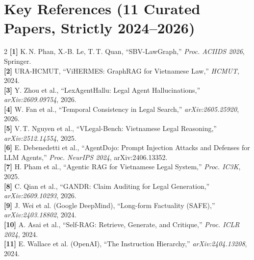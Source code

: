 \documentclass[10pt,a4paper]{article}
\begin{document}
\section{Key References (11 Curated Papers, Strictly 2024--2026)}
\vspace{-1.5pt}
\begin{multicols}{2}
  \fontsize{5.9pt}{7.0pt}\selectfont\color{darkgray}
  \textbf{[1]} K.\,N. Phan, X.-B. Le, T.\,T. Quan, ``SBV-LawGraph,'' \textit{Proc. ACIIDS 2026}, Springer.\\
  \textbf{[2]} URA-HCMUT, ``ViHERMES: GraphRAG for Vietnamese Law,'' \textit{HCMUT}, 2024.\\
  \textbf{[3]} Y. Zhou et al., ``LexAgentHallu: Legal Agent Hallucinations,'' \textit{arXiv:2609.09754}, 2026.\\
  \textbf{[4]} W. Fan et al., ``Temporal Consistency in Legal Search,'' \textit{arXiv:2605.25920}, 2026.\\
  \textbf{[5]} V.\,T. Nguyen et al., ``VLegal-Bench: Vietnamese Legal Reasoning,'' \textit{arXiv:2512.14554}, 2025.\\
  \textbf{[6]} E. Debenedetti et al., ``AgentDojo: Prompt Injection Attacks and Defenses for LLM Agents,'' \textit{Proc. NeurIPS 2024}, arXiv:2406.13352.\\
  \textbf{[7]} H. Pham et al., ``Agentic RAG for Vietnamese Legal System,'' \textit{Proc. IC3K}, 2025.\\
  \textbf{[8]} C. Qian et al., ``GANDR: Claim Auditing for Legal Generation,'' \textit{arXiv:2609.10293}, 2026.\\
  \textbf{[9]} J. Wei et al. (Google DeepMind), ``Long-form Factuality (SAFE),'' \textit{arXiv:2403.18802}, 2024.\\
  \textbf{[10]} A. Asai et al., ``Self-RAG: Retrieve, Generate, and Critique,'' \textit{Proc. ICLR 2024}, 2024.\\
  \textbf{[11]} E. Wallace et al. (OpenAI), ``The Instruction Hierarchy,'' \textit{arXiv:2404.13208}, 2024.
\end{multicols}
\end{document}
